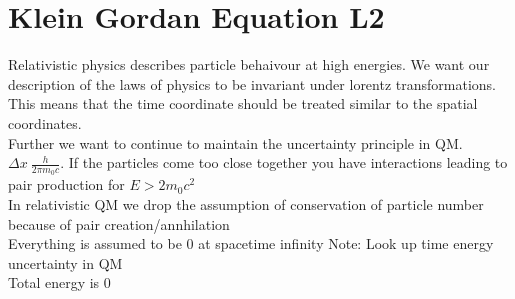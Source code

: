\documentclass{article}
\newcommand{\note}[1]{\color{blue} Note: #1}
\begin{document}
\section{Klein Gordan Equation L2}
Relativistic physics describes particle 
behaivour at high energies. We want our description of the laws of physics to be invariant under lorentz transformations. This means that the time coordinate should be treated similar to the spatial coordinates. \\
Further we want to continue to maintain the uncertainty principle in QM. \(\Delta x ~ \frac{h}{2\pi m_0c}\). If the particles come too close together you have interactions leading to pair production for \(E > 2m_0c^2\) \\
In relativistic QM we drop the assumption of conservation of particle number because of pair creation/annhilation \\

Everything is assumed to be 0 at spacetime infinity
\note{Look up time energy uncertainty in QM} \\
Total energy is 0
\end{document}
